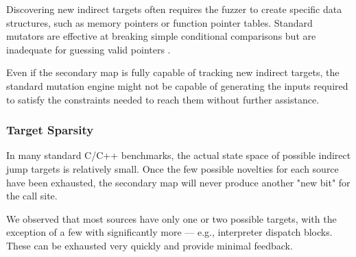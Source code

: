 Discovering new indirect targets often requires the fuzzer to create specific data structures, such as memory pointers or function pointer tables. Standard mutators are effective at breaking simple conditional comparisons but are inadequate for guessing valid pointers \cite{aschermann2019redqueen, rawat2017vuzzer, wang2010taintscope}. 

Even if the secondary map is fully capable of tracking new indirect targets, the standard mutation engine might not be capable of generating the inputs required to satisfy the constraints needed to reach them without further assistance.

\subsubsection{Target Sparsity}

In many standard C/C++ benchmarks, the actual state space of possible indirect jump targets is relatively small. Once the few possible novelties for each source have been exhausted, the secondary map will never produce another "new bit" for the call site.

We observed that most sources have only one or two possible targets, with the exception of a few with significantly more --- e.g., interpreter dispatch blocks. These can be exhausted very quickly and provide minimal feedback.